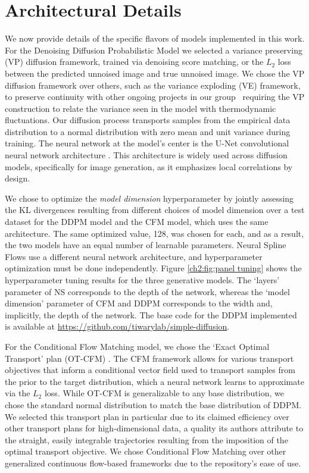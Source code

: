 \section{Architectural Details}
\label{ch2:sec:architectural-details}

We now provide details of the specific flavors of models implemented in this work. For the Denoising Diffusion Probabilistic Model we selected a variance preserving (VP) diffusion framework, trained via denoising score matching, or the $L_2$ loss between the predicted unnoised image and true unnoised image. We chose the VP diffusion framework over others, such as the variance exploding (VE) framework, to preserve continuity with other ongoing projects in our group~\cite{herron2024inferring} requiring the VP construction to relate the variance seen in the model with thermodynamic fluctuations. Our diffusion process transports samples from the empirical data distribution to a normal distribution with zero mean and unit variance during training. The neural network at the model's center is the U-Net convolutional neural network architecture \cite{unet}. This architecture is widely used across diffusion models, specifically for image generation, as it emphasizes local correlations by design.

We chose to optimize the \textit{model dimension} hyperparameter by jointly assessing the KL divergences resulting from different choices of model dimension over a test dataset for the DDPM model and the CFM model, which uses the same architecture. The same optimized value, 128, was chosen for each, and as a result, the two models have an equal number of learnable parameters. Neural Spline Flows use a different neural network architecture, and hyperparameter optimization must be done independently. Figure \ref{ch2:fig:panel tuning} shows the hyperparameter tuning results for the three generative models. The `layers' parameter of NS corresponds to the depth of the network, whereas the `model dimension' parameter of CFM and DDPM corresponds to the width and, implicitly, the depth of the network. The base code for the DDPM implemented is available at \url{https://github.com/tiwarylab/simple-diffusion}.

For the Conditional Flow Matching model, we chose the `Exact Optimal Transport' plan (OT-CFM) \cite{tong2023improving}. The CFM framework allows for various transport objectives that inform a conditional vector field used to transport samples from the prior to the target distribution, which a neural network learns to approximate via the $L_2$ loss. While OT-CFM is generalizable to any base distribution, we chose the standard normal distribution to match the base distribution of DDPM. We selected this transport plan in particular due to its claimed efficiency over other transport plans for high-dimensional data, a quality its authors attribute to the straight, easily integrable trajectories resulting from the imposition of the optimal transport objective. We chose Conditional Flow Matching over other generalized continuous flow-based frameworks due to the repository's ease of use.

